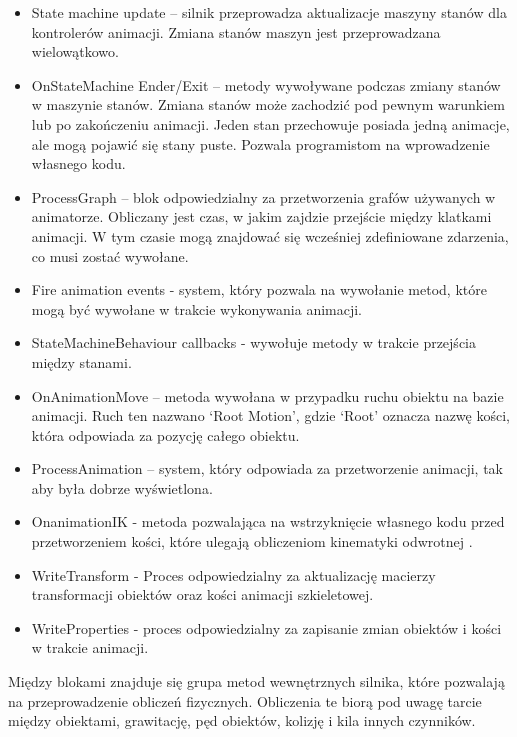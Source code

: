 \documentclass[12pt,twoside]{article}
\begin{document}
\begin{itemize}
\item State machine update – silnik przeprowadza aktualizacje maszyny stanów dla
kontrolerów animacji. Zmiana stanów maszyn jest przeprowadzana wielowątkowo. 
\item OnStateMachine Ender/Exit – metody wywoływane podczas zmiany stanów w
maszynie stanów. Zmiana stanów może zachodzić pod pewnym warunkiem lub po
zakończeniu animacji. Jeden stan przechowuje posiada jedną animacje, ale mogą
pojawić się stany puste. Pozwala programistom na wprowadzenie własnego kodu.
\cite{Unity:StateChangeEnter,Unity:StateChangeExit}
\item ProcessGraph – blok odpowiedzialny za przetworzenia grafów używanych w
animatorze. Obliczany jest czas, w jakim zajdzie przejście między klatkami
animacji. W tym czasie mogą znajdować się wcześniej zdefiniowane zdarzenia, co
musi zostać wywołane. 
\item Fire animation events - system, który pozwala na wywołanie metod, które
mogą być wywołane w trakcie wykonywania animacji. 
\item StateMachineBehaviour callbacks - wywołuje metody w trakcie
przejścia między stanami. 
\item OnAnimationMove – metoda wywołana w przypadku ruchu obiektu na bazie
animacji. Ruch ten nazwano ‘Root Motion’, gdzie ‘Root’ oznacza nazwę kości,
która odpowiada za pozycję całego obiektu.  
\item ProcessAnimation – system, który odpowiada za przetworzenie animacji, tak
aby była dobrze wyświetlona.  
\item OnanimationIK - metoda pozwalająca na wstrzyknięcie własnego kodu przed
przetworzeniem kości, które ulegają obliczeniom kinematyki odwrotnej \cite{Unity:ONAnimationIK}.   
\item WriteTransform - Proces odpowiedzialny za aktualizację macierzy
transformacji obiektów oraz kości animacji szkieletowej. 
\item WriteProperties - proces odpowiedzialny za zapisanie zmian obiektów i kości w trakcie animacji.  
\end{itemize}
Między blokami znajduje się grupa metod wewnętrznych silnika, które pozwalają na
przeprowadzenie obliczeń fizycznych. Obliczenia te biorą pod uwagę tarcie między
obiektami, grawitację, pęd obiektów, kolizję i kila innych czynników.   
\end{document}
